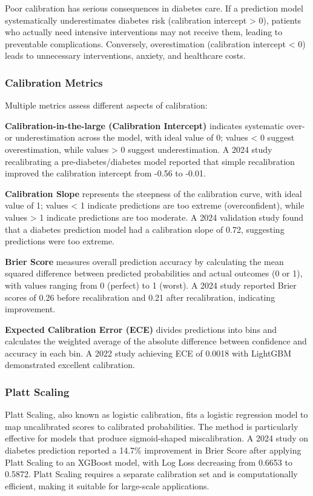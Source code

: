 Poor calibration has serious consequences in diabetes care. If a prediction model systematically underestimates diabetes risk (calibration intercept > 0), patients who actually need intensive interventions may not receive them, leading to preventable complications. Conversely, overestimation (calibration intercept < 0) leads to unnecessary interventions, anxiety, and healthcare costs.

\subsubsection{Calibration Metrics}

Multiple metrics assess different aspects of calibration:

\textbf{Calibration-in-the-large (Calibration Intercept)} indicates systematic over- or underestimation across the model, with ideal value of 0; values < 0 suggest overestimation, while values > 0 suggest underestimation. A 2024 study recalibrating a pre-diabetes/diabetes model reported that simple recalibration improved the calibration intercept from -0.56 to -0.01.

\textbf{Calibration Slope} represents the steepness of the calibration curve, with ideal value of 1; values < 1 indicate predictions are too extreme (overconfident), while values > 1 indicate predictions are too moderate. A 2024 validation study found that a diabetes prediction model had a calibration slope of 0.72, suggesting predictions were too extreme.

\textbf{Brier Score} measures overall prediction accuracy by calculating the mean squared difference between predicted probabilities and actual outcomes (0 or 1), with values ranging from 0 (perfect) to 1 (worst). A 2024 study reported Brier scores of 0.26 before recalibration and 0.21 after recalibration, indicating improvement.

\textbf{Expected Calibration Error (ECE)} divides predictions into bins and calculates the weighted average of the absolute difference between confidence and accuracy in each bin. A 2022 study achieving ECE of 0.0018 with LightGBM demonstrated excellent calibration.

\subsubsection{Platt Scaling}

Platt Scaling, also known as logistic calibration, fits a logistic regression model to map uncalibrated scores to calibrated probabilities. The method is particularly effective for models that produce sigmoid-shaped miscalibration. A 2024 study on diabetes prediction reported a 14.7\% improvement in Brier Score after applying Platt Scaling to an XGBoost model, with Log Loss decreasing from 0.6653 to 0.5872. Platt Scaling requires a separate calibration set and is computationally efficient, making it suitable for large-scale applications.


